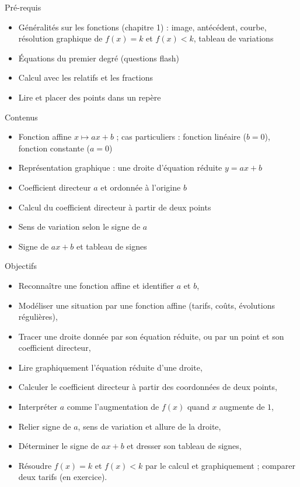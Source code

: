 \documentclass{article}
\theoremstyle{definition}
\begin{document}
\pagestyle{fancy}

\fancyhf{} %
\fancyhead[L]{\large \textbf{\Niveau}}
\fancyhead[C]{\large \textbf{\Chapitre}}

\large

\begin{paragraph}{Pré-requis}
  \begin{itemize}
    \item Généralités sur les fonctions (chapitre 1) : image, antécédent, courbe, résolution graphique de $f(x)=k$ et $f(x)<k$, tableau de variations
    \item Équations du premier degré (questions flash)
    \item Calcul avec les relatifs et les fractions
    \item Lire et placer des points dans un repère
  \end{itemize}
\end{paragraph}

\begin{paragraph}{Contenus}
  \begin{itemize}
    \item Fonction affine $x \mapsto ax+b$ ; cas particuliers : fonction linéaire ($b=0$), fonction constante ($a=0$)
    \item Représentation graphique : une droite d'équation réduite $y=ax+b$
    \item Coefficient directeur $a$ et ordonnée à l'origine $b$
    \item Calcul du coefficient directeur à partir de deux points
    \item Sens de variation selon le signe de $a$
    \item Signe de $ax+b$ et tableau de signes
  \end{itemize}
\end{paragraph}

\begin{paragraph}{Objectifs}
  \begin{itemize}
    \item Reconnaître une fonction affine et identifier $a$ et $b$,
    \item Modéliser une situation par une fonction affine (tarifs, coûts, évolutions régulières),
    \item Tracer une droite donnée par son équation réduite, ou par un point et son coefficient directeur,
    \item Lire graphiquement l'équation réduite d'une droite,
    \item Calculer le coefficient directeur à partir des coordonnées de deux points,
    \item Interpréter $a$ comme l'augmentation de $f(x)$ quand $x$ augmente de $1$,
    \item Relier signe de $a$, sens de variation et allure de la droite,
    \item Déterminer le signe de $ax+b$ et dresser son tableau de signes,
    \item Résoudre $f(x)=k$ et $f(x)<k$ par le calcul et graphiquement ; comparer deux tarifs (en exercice).
  \end{itemize}
\end{paragraph}
\end{document}
